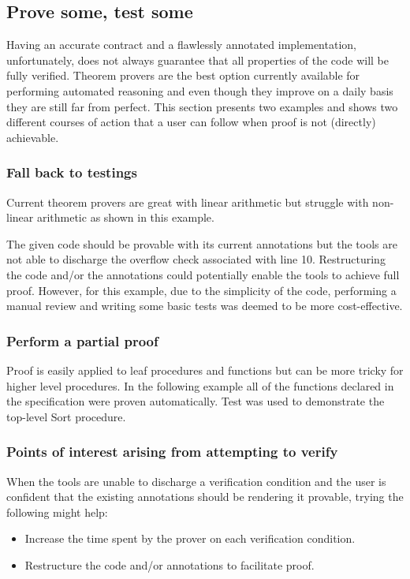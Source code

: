 \documentclass{llncs} \usepackage[utf8]{inputenc} \usepackage{url}
\begin{document}
\subsection{Prove some, test some}
Having an accurate contract and a flawlessly annotated implementation,
unfortunately, does not always guarantee that all properties of the
code will be fully verified.  Theorem provers are the best option
currently available for performing automated reasoning and even though
they improve on a daily basis they are still far from perfect.  This
section presents two examples and shows two different courses of
action that a user can follow when proof is not (directly) achievable.

\subsubsection{Fall back to testings}
Current theorem provers are great with linear arithmetic but struggle
with non-linear arithmetic as shown in this example.

 The given code
should be provable with its current annotations but the tools are not
able to discharge the overflow check associated with line
10. Restructuring the code and/or the annotations could potentially
enable the tools to achieve full proof. However, for this example, due
to the simplicity of the code, performing a manual review and writing
some basic tests was deemed to be more cost-effective.

\subsubsection{Perform a partial proof}
Proof is easily applied to leaf procedures and functions but can be
more tricky for higher level procedures. In the following example all
of the functions declared in the specification were proven
automatically. Test was used to demonstrate the top-level Sort
procedure.




\subsubsection{Points of interest arising from attempting to verify}
When the tools are unable to discharge a verification condition and
the user is confident that the existing annotations should be
rendering it provable, trying the following might help:
\begin{itemize}
\item Increase the time spent by the prover on each verification
  condition.

\item Restructure the code and/or annotations to facilitate proof.
\end{itemize}
\end{document}
